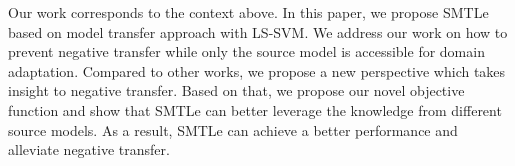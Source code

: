 Our work corresponds to the context above. In this paper, we propose SMTLe based on model transfer approach with LS-SVM. We address our work on how to prevent negative transfer while only the source model is accessible for domain adaptation. Compared to other works, we propose a new perspective which takes insight to negative transfer. 
Based on that, we propose our novel objective function and show that SMTLe can better leverage the knowledge from different source models. As a result, SMTLe can achieve a better performance and alleviate negative transfer.
